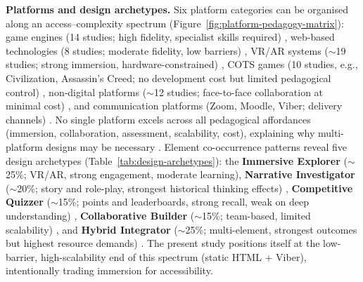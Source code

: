 \textbf{Platforms and design archetypes.} \label{sec:archetypes} Six platform categories can be organised along an access--complexity spectrum (Figure~\ref{fig:platform-pedagogy-matrix}): game engines (14 studies; high fidelity, specialist skills required) \cite{1Barbatsis201159, 6Czerwinski2018, 32Cheng20241718}, web-based technologies (8 studies; moderate fidelity, low barriers) \cite{48Moketar2021, 5kazanidis2018alpha}, VR/AR systems ($\sim$19 studies; strong immersion, hardware-constrained) \cite{73Wolfartsberger2011160, 31DeAmicis2009451}, COTS games (10 studies, e.g., Civilization, Assassin's Creed; no development cost but limited pedagogical control) \cite{55Squire2004, 12Gilbert2019108, 37Lewis202054}, non-digital platforms ($\sim$12 studies; face-to-face collaboration at minimal cost) \cite{46Stirling2022, 40Kuran2018, 76Corbeil2011462}, and communication platforms (Zoom, Moodle, Viber; delivery channels) \cite{Gupta2022341, Bozic2024538}. No single platform excels across all pedagogical affordances (immersion, collaboration, assessment, scalability, cost), explaining why multi-platform designs may be necessary \cite{KorniienkoSemerikov2024}. Element co-occurrence patterns reveal five design archetypes (Table~\ref{tab:design-archetypes}): the \textbf{Immersive Explorer} ($\sim$25\%; VR/AR, strong engagement, moderate learning), \textbf{Narrative Investigator} ($\sim$20\%; story and role-play, strongest historical thinking effects) \cite{59Kee2014270, 74Fendt2019}, \textbf{Competitive Quizzer} ($\sim$15\%; points and leaderboards, strong recall, weak on deep understanding) \cite{34Serrano2023, 43ali2021indonesian}, \textbf{Collaborative Builder} ($\sim$15\%; team-based, limited scalability) \cite{46Stirling2022, 49Huizenga2007127}, and \textbf{Hybrid Integrator} ($\sim$25\%; multi-element, strongest outcomes but highest resource demands) \cite{55Squire2004, 12Gilbert2019108}. The present study positions itself at the low-barrier, high-scalability end of this spectrum (static HTML + Viber), intentionally trading immersion for accessibility.




